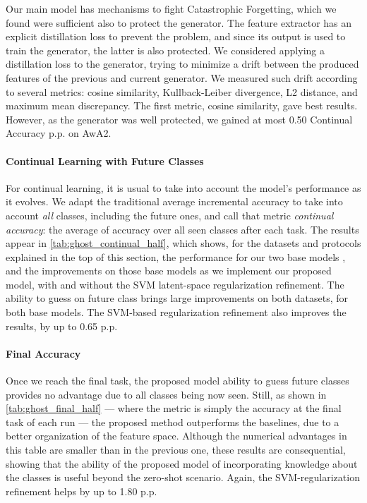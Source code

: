 Our main model has mechanisms to fight Catastrophic Forgetting, which we found were sufficient also
to protect the generator. The feature extractor has an explicit distillation loss to prevent the
problem, and since its output is used to train the generator, the latter is also protected.
We considered applying a distillation loss to the generator, trying to minimize a drift between
the produced features of the previous and current generator. We measured such drift according to
several metrics: cosine similarity, Kullback-Leiber divergence, L2 distance, and maximum mean
discrepancy. The first metric, cosine similarity, gave best results. However, as the generator was
well protected, we gained at most 0.50 Continual Accuracy p.p. on AwA2.





\paragraph{Continual Learning with Future Classes}
For continual learning, it is usual to take into account the model's performance as it evolves. We
adapt the traditional average incremental accuracy \citep{rebuffi2017icarl} to take into account
\textit{all} classes, including the future ones, and call that metric \textit{continual accuracy}:
the average of accuracy over all seen classes after each task. The results appear in
\autoref{tab:ghost_continual_half}, which shows, for the datasets and protocols explained in the top
of this section, the performance for our two base models \citep{hou2019ucir,douillard2020podnet},
and the improvements on those base models as we implement our proposed model, with and without the
SVM latent-space regularization refinement. The ability to guess on future class brings large
improvements on both datasets, for both base models. The SVM-based regularization refinement also
improves the results, by up to 0.65 p.p.



\paragraph{Final Accuracy} Once we reach the final task, the proposed model ability to guess
future classes provides no advantage due to all classes being now seen. Still, as shown in
\autoref{tab:ghost_final_half} — where the metric is simply the accuracy at the final task of each
run — the proposed method outperforms the baselines, due to a better organization of the feature
space. Although the numerical advantages in this table are smaller than in the previous one, these
results are consequential, showing that the ability of the proposed model of incorporating knowledge
about the classes is useful beyond the zero-shot scenario. Again, the SVM-regularization refinement
helps by up to 1.80 p.p.

